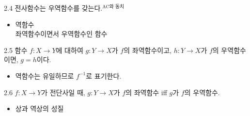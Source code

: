 \documentclass{article}
\begin{document}
\begin{prop}{}{2.4}
    전사함수는 우역함수를 갖는다.$^{\text{AC와 동치}}$
\end{prop}

\begin{itemize}
    \item 역함수\\
        좌역함수이면서 우역함수인 함수
\end{itemize}

\begin{prop}{}{2.5}
    함수 $f:X\to Y$에 대하여 $g:Y\to X$가 $f$의 좌역함수이고, $h:Y\to X$가 $f$의 우역함수이면, $g=h$이다.
\end{prop}

\begin{itemize}
    \item[$\blacktriangleright$] 역함수는 유일하므로 $f^{-1}$로 표기한다.
\end{itemize}

\begin{prop}{}{2.6}
    $f:X\to Y$가 전단사일 때, $g:Y\to X$가 $f$의 좌역함수 iff $g$가 $f$의 우역함수.
\end{prop}

\begin{itemize}
    \item[$\bigstar$] 상과 역상의 성질
\end{itemize}
\end{document}
